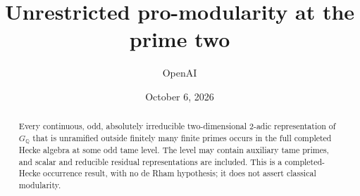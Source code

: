 \documentclass[11pt]{article}
\title{Unrestricted pro-modularity at the prime two}
\author{OpenAI}
\date{October 6, 2026}
\theoremstyle{definition}
\theoremstyle{remark}
\newcommand{\Q}{\mathbb Q}
\begin{document}
\maketitle
\begin{abstract}
Every continuous, odd, absolutely irreducible two-dimensional
$2$-adic representation of $G_{\Q}$ that is unramified outside finitely
many finite primes occurs in the full completed Hecke algebra at some
odd tame level. The level may contain auxiliary tame primes, and scalar
and reducible residual representations are included. This is a
completed-Hecke occurrence result, with no de Rham hypothesis; it does
not assert classical modularity.
\end{abstract}










\end{document}
